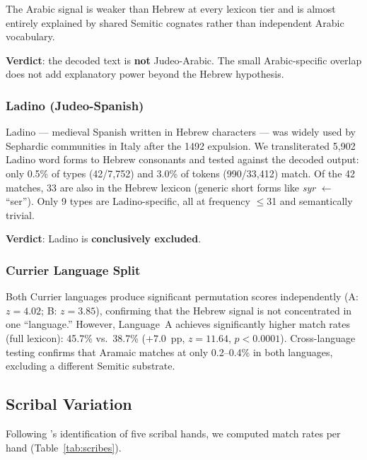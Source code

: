 \documentclass[11pt,a4paper]{article}
\begin{document}
The Arabic signal is weaker than Hebrew at every lexicon tier and is almost
entirely explained by shared Semitic cognates rather than independent Arabic
vocabulary.

\textbf{Verdict}: the decoded text is \textbf{not} Judeo-Arabic. The small
Arabic-specific overlap does not add explanatory power beyond the Hebrew
hypothesis.

\subsubsection{Ladino (Judeo-Spanish)}
\label{sec:ladino}

Ladino --- medieval Spanish written in Hebrew characters --- was widely used
by Sephardic communities in Italy after the 1492 expulsion. We transliterated
5,902 Ladino word forms to Hebrew consonants and tested against the decoded
output: only 0.5\% of types (42/7,752) and 3.0\% of tokens (990/33,412) match.
Of the 42 matches, 33 are also in the Hebrew lexicon (generic short forms like
\emph{syr} $\leftarrow$ ``ser''). Only 9 types are Ladino-specific, all at
frequency $\leq$31 and semantically trivial.

\textbf{Verdict}: Ladino is \textbf{conclusively excluded}.

\subsubsection{Currier Language Split}
\label{sec:currier}

Both Currier languages produce significant permutation scores independently
(A: $z=4.02$; B: $z=3.85$), confirming that the Hebrew signal is not
concentrated in one ``language.'' However, Language~A achieves significantly
higher match rates (full lexicon): 45.7\% vs.\ 38.7\% ($+7.0$~pp, $z=11.64$, $p<0.0001$).
Cross-language testing confirms that Aramaic matches at only 0.2--0.4\% in
both languages, excluding a different Semitic substrate.


\subsection{Scribal Variation}
\label{sec:scribes}

Following \citet{Davis2020}'s identification of five scribal hands, we
computed match rates per hand (Table~\ref{tab:scribes}).
\end{document}
